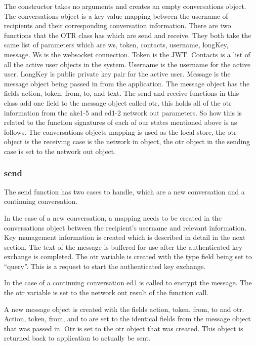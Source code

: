 The constructor takes no arguments and creates an empty conversations object. The conversations object is a key value mapping between the username of recipients and their corresponding conversation information. There are two functions that the OTR class has which are send and receive. They both take the same list of parameters which are ws, token, contacts, username, longKey, message. Ws is the websocket connection. Token is the JWT. Contacts is a list of all the active user objects in the system. Username is the username for the active user. LongKey is public private key pair for the active user. Message is the message object being passed in from the application. The message object has the fields action, token, from, to, and text. The send and receive functions in this class add one field to the message object called otr, this holds all of the otr information from the ake1-5 and ed1-2 network out parameters. So how this is related to the function signatures of each of our states mentioned above is as follows. The conversations objects mapping is used as the local store, the otr object is the receiving case is the network in object, the otr object in the sending case is set to the network out object.  


\subsubsection{send}


The send function has two cases to handle, which are a new conversation and a continuing conversation.


In the case of a new conversation, a mapping needs to be created in the conversations object between the recipient's username and relevant information. Key management information is created which is described in detail in the next section. The text of the message is buffered for use after the authenticated key exchange is completed. The otr variable is created with the type field being set to “query”. This is a request to start the authenticated key exchange.


In the case of a continuing conversation ed1 is called to encrypt the message. The the otr variable is set to the network out result of the function call. 


A new message object is created with the fields action, token, from, to and otr. Action, token, from, and to are set to the identical fields from the message object that was passed in. Otr is set to the otr object that was created. This object is returned back to application to actually be sent.


